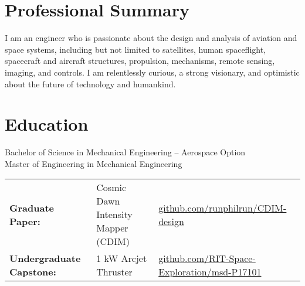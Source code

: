 \documentclass[10pt,final,sans]{resume}
\begin{document}
\setlength\headheight{28pt} %

\section{Professional Summary}
I am an engineer who is passionate about the design and analysis of
aviation and space systems, including but not limited to satellites, human
spaceflight, spacecraft and aircraft structures, propulsion, mechanisms, remote sensing, 
imaging, and controls. I am relentlessly curious, a strong visionary, and
optimistic about the future of technology and humankind.

\section{Education}
Bachelor of Science in Mechanical Engineering -- Aerospace Option \\
Master of Engineering in Mechanical Engineering \\
\begin{tabular}{@{}lll@{}}
{\bf Graduate Paper:} & Cosmic Dawn Intensity Mapper (CDIM) & \href{https://github.com/runphilrun/CDIM-design/blob/master/cdim_design.pdf}{github.com/runphilrun/CDIM-design} \\
{\bf Undergraduate Capstone:} & 1 kW Arcjet Thruster & \href{https://github.com/RIT-Space-Exploration/msd-P17101/blob/master/p17101.pdf}{github.com/RIT-Space-Exploration/msd-P17101}
\end{tabular}
\end{document}
